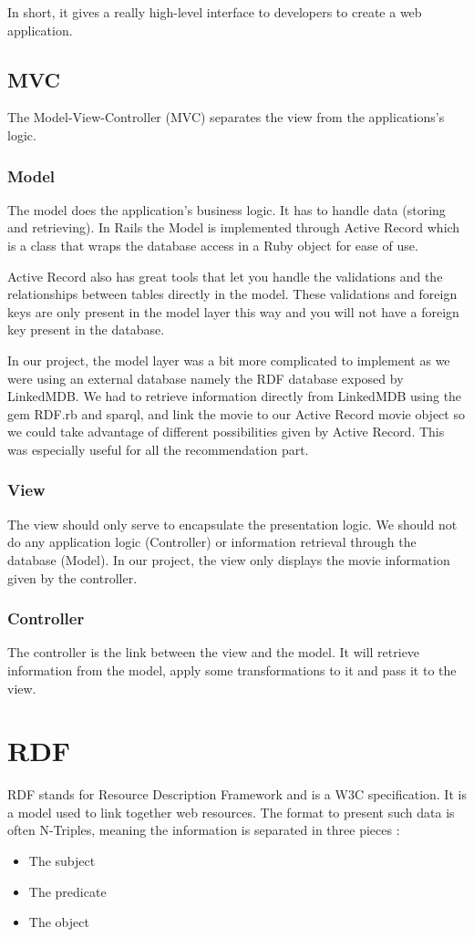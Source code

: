 \documentclass[12pt,a4paper]{article}
\begin{document}
In short, it gives a really high-level interface to developers to create a web application.
\subsection{MVC}
The Model-View-Controller (MVC) separates the view from the applications's logic.

\subsubsection{Model}
The model does the application's business logic. It has to handle data (storing and retrieving). In Rails the Model is implemented through Active Record which is a class that wraps the database access in a Ruby object for ease of use.

Active Record also has great tools that let you handle the validations and the relationships between tables directly in the model. These validations and foreign keys are only present in the model layer this way and you will not have a foreign key present in the database.

In our project, the model layer was a bit more complicated to implement as we were using an external database namely the RDF database exposed by LinkedMDB. We had to retrieve information directly from LinkedMDB using the gem RDF.rb and sparql, and link the movie to our Active Record movie object so we could take advantage of different possibilities given by Active Record. This was especially useful for all the recommendation part.

\subsubsection{View}
The view should only serve to encapsulate the presentation logic. We should not do any application logic (Controller) or information retrieval through the database (Model). In our project, the view only displays the movie information given by the controller.

\subsubsection{Controller}
The controller is the link between the view and the model. It will retrieve information from the model, apply some transformations to it and pass it to the view.

\section{RDF}\label{rdf}
RDF stands for Resource Description Framework and is a W3C specification. It is a model used to link together web resources. The format to present such data is often N-Triples, meaning the information is separated in three pieces :
\begin{itemize}
\item The subject
\item The predicate
\item The object
\end{itemize}
\end{document}
